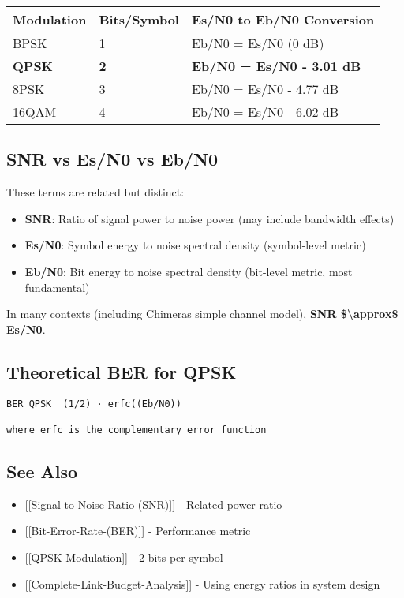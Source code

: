 {\def\LTcaptype{} %
\begin{longtable}[]{@{}lll@{}}
\toprule\noalign{}
Modulation & Bits/Symbol & Es/N0 to Eb/N0 Conversion \\
\midrule\noalign{}
\endhead
\bottomrule\noalign{}
\endlastfoot
BPSK & 1 & Eb/N0 = Es/N0 (0 dB) \\
\textbf{QPSK} & \textbf{2} & \textbf{Eb/N0 = Es/N0 - 3.01 dB} \\
8PSK & 3 & Eb/N0 = Es/N0 - 4.77 dB \\
16QAM & 4 & Eb/N0 = Es/N0 - 6.02 dB \\
\end{longtable}
}

\subsection{SNR vs Es/N0 vs Eb/N0}\label{snr-vs-esn0-vs-ebn0}

These terms are related but distinct:

\begin{itemize}
\tightlist
\item
  \textbf{SNR}: Ratio of signal power to noise power (may include
  bandwidth effects)
\item
  \textbf{Es/N0}: Symbol energy to noise spectral density (symbol-level
  metric)
\item
  \textbf{Eb/N0}: Bit energy to noise spectral density (bit-level
  metric, most fundamental)
\end{itemize}

In many contexts (including Chimera\textquotesingle s simple channel
model), \textbf{SNR \$\textbackslash approx\$ Es/N0}.

\subsection{Theoretical BER for QPSK}\label{theoretical-ber-for-qpsk}

\begin{verbatim}
BER_QPSK  (1/2) · erfc((Eb/N0))

where erfc is the complementary error function
\end{verbatim}

\subsection{See Also}\label{see-also}

\begin{itemize}
\tightlist
\item
  {[}{[}Signal-to-Noise-Ratio-(SNR){]}{]} - Related power ratio
\item
  {[}{[}Bit-Error-Rate-(BER){]}{]} - Performance metric
\item
  {[}{[}QPSK-Modulation{]}{]} - 2 bits per symbol
\item
  {[}{[}Complete-Link-Budget-Analysis{]}{]} - Using energy ratios in
  system design
\end{itemize}
